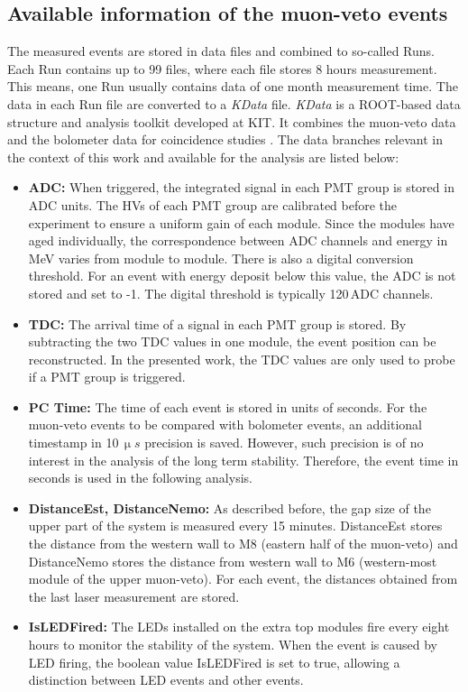 \subsection{Available information of the muon-veto events}

The measured events are stored in data files and combined to so-called Runs. Each Run contains up to 99 files, where each file stores 8 hours measurement. This means, one Run usually contains data of one month measurement time. The data in each Run file are converted to a \textit{KData} file. \textit{KData} is a ROOT-based \cite{Bru97} data structure and analysis toolkit developed at KIT. It combines the muon-veto data and the bolometer data for coincidence studies \cite{Cox12}.
The data branches relevant in the context of this work and available for the analysis are listed below:
\begin{itemize}
  \item \textbf{ADC: }
  When triggered, the integrated signal in each PMT group is stored in ADC units. The HVs of each PMT group are calibrated before the experiment to ensure a uniform gain of each module. Since the modules have aged individually, the correspondence between ADC channels and energy in MeV varies from module to module. There is also a digital conversion threshold. For an event with energy deposit below this value, the ADC is not stored and set to -1. The digital threshold is typically 120\,ADC channels.

  \item \textbf{TDC: }
  The arrival time of a signal in each PMT group is stored. By subtracting the two TDC values in one module, the event position can be reconstructed. In the presented work, the TDC values are only used to probe if a PMT group is triggered.


  \item \textbf{PC Time: }
  The time of each event is stored in units of seconds. For the muon-veto events to be compared with bolometer events, an additional timestamp in 10$\,\si{\upmu s}$ precision is saved. However, such precision is of no interest in the analysis of the long term stability. Therefore, the event time in seconds is used in the following analysis.

  \item \textbf{DistanceEst, DistanceNemo:}
  As described before, the gap size of the upper part of the system is measured every 15 minutes. DistanceEst stores the distance from the western wall to M8 (eastern half of the muon-veto) and DistanceNemo stores the distance from western wall to M6 (western-most module of the upper muon-veto). For each event, the distances obtained from the last laser measurement are stored.

  \item \textbf{IsLEDFired: }
  The LEDs installed on the extra top modules fire every eight hours to monitor the stability of the system. When the event is caused by LED firing, the boolean value IsLEDFired is set to true, allowing a distinction between LED events and other events.
\end{itemize}



